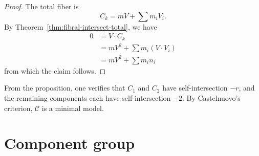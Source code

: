 \documentclass{article}
\newcommand{\scd}{\mathscr{C}}
\theoremstyle{plain}
\theoremstyle{definition}
\theoremstyle{remark}
\begin{document}
\begin{proof}
  The total fiber is
  \[
  C_k = mV + \sum m_i V_i.
  \]
  By Theorem~\ref{thm:fibral-intersect-total}, we have
  \begin{align*}
    0 &= V \cdot C_k \\
    &= mV^2 + \sum m_i (V \cdot V_i) \\
    &= mV^2 + \sum m_i n_i
  \end{align*}
  from which the claim follows.
\end{proof}

From the proposition, one verifies that $C_1$ and $C_2$ have self-intersection $-r$, and the remaining components each have self-intersection $-2$. By Castelnuovo's criterion, $\scd$ is a minimal model. 




\section{Component group}
\label{sec:component-group}





\end{document}
